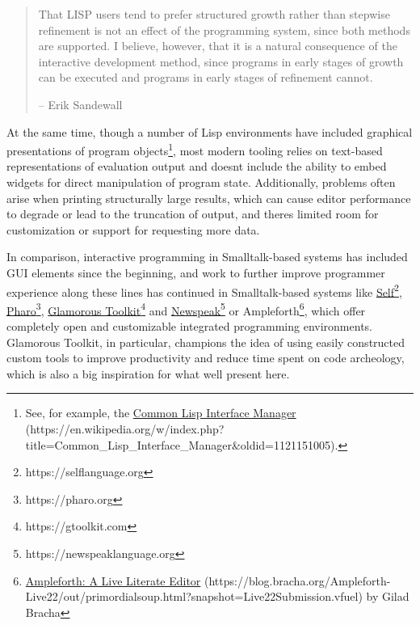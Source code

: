\documentclass[sigconf,screen]{acmart}
\begin{document}
\begin{quote}
That LISP users tend to prefer structured growth rather than stepwise refinement is not an effect of the programming system, since both methods are supported. I believe, however, that it is a natural consequence of the interactive development method, since programs in early stages of growth can be executed and programs in early stages of refinement cannot. \cite{Sandewall_1978}

-- Erik Sandewall
\end{quote}

At the same time, though a number of Lisp environments have included graphical presentations of program objects\footnote{See, for example, the {\href{https://en.wikipedia.org/w/index.php?title=Common_Lisp_Interface_Manager\&oldid=1121151005}{Common Lisp Interface Manager} (https://en.wikipedia.org/w/index.php?title=Common\_Lisp\_Interface\_Manager\&oldid=1121151005)}.}, most modern tooling relies on text-based representations of evaluation output and doesn\textquotesingle t include the ability to embed widgets for direct manipulation of program state. Additionally, problems often arise when printing structurally large results, which can cause editor performance to degrade or lead to the truncation of output, and there\textquotesingle s limited room for customization or support for requesting more data.

In comparison, interactive programming in Smalltalk-based systems has included GUI elements since the beginning, and work to further improve programmer experience along these lines has continued in Smalltalk-based systems like {\href{https://selflanguage.org}{Self}\footnote{https://selflanguage.org}}, {\href{https://pharo.org}{Pharo}\footnote{https://pharo.org}}, {\href{https://gtoolkit.com}{Glamorous Toolkit}\footnote{https://gtoolkit.com}} \cite{Chi__2015} and {\href{https://newspeaklanguage.org}{Newspeak}\footnote{https://newspeaklanguage.org}} or Ampleforth\footnote{{\href{https://blog.bracha.org/Ampleforth-Live22/out/primordialsoup.html?snapshot=Live22Submission.vfuel}{Ampleforth: A Live Literate Editor} (https://blog.bracha.org/Ampleforth-Live22/out/primordialsoup.html?snapshot=Live22Submission.vfuel)} by Gilad Bracha}, which offer completely open and customizable integrated programming environments. Glamorous Toolkit, in particular, champions the idea of using easily constructed custom tools to improve productivity and reduce time spent on code archeology, which is also a big inspiration for what we\textquotesingle ll present here.
\end{document}
